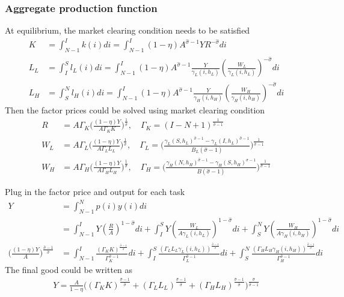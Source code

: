 \documentclass[12pt]{article}
\begin{document}
\begin{appendices}
\subsubsection*{Aggregate production function}
At equilibrium, the market clearing condition needs to be satisfied
\begin{align*}
K &= \int_{N-1}^I k(i)di=  \int_{N-1}^I(1-\eta)A^{\hat{\sigma}-1}YR^{-\hat{\sigma}}di \\
L_L &= \int_{I}^S l_L(i)di=  \int_{N-1}^I (1-\eta)A^{\hat{\sigma}-1}\frac{Y}{\gamma_L(i,h_L)}(\frac{W_L}{\gamma_L(i,h_L)})^{-\hat{\sigma}}di \\
L_H &=\int_{S}^N l_H(i)di=  \int_{N-1}^I (1-\eta)A^{\hat{\sigma}-1}\frac{Y}{\gamma_H(i,h_H)}(\frac{W_H}{\gamma_H(i,h_H)})^{-\hat{\sigma}} di
\end{align*}
Then the factor prices could be solved using market clearing condition 
\begin{align*}
R &=A\Gamma_K \Big(\frac{(1-\eta)Y}{A\Gamma_K K}\Big)^{\frac{1}{\hat{\sigma}}}, \quad \Gamma_K= (I-N+1)^{\frac{1}{\hat{\sigma}-1}}  \\
W_L &= A\Gamma_L\Big(\frac{(1-\eta)Y}{A\Gamma_LL_L}\Big)^{\frac{1}{\hat{\sigma}}}, \quad \Gamma_L=\Big(\frac{\gamma_L(S,h_L)^{\hat{\sigma}-1}-\gamma_L(I,h_L)^{\hat{\sigma}-1}}{B_L(\hat{\sigma}-1)}\Big)^{\frac{1}{\hat{\sigma}-1}}  \\
W_H &=A\Gamma_H\Big(\frac{(1-\eta)Y}{A\Gamma_HL_H}\Big)^{\frac{1}{\hat{\sigma}}}, \quad \Gamma_H = \Big(\frac{\gamma_H(N,h_H)^{\hat{\sigma}-1}-\gamma_H(S,h_H)^{\hat{\sigma}-1}}{B(\hat{\sigma}-1)}\Big)^{\frac{1}{\hat{\sigma}-1}} 
\end{align*}

Plug in the factor price and output for each task 
\begin{align*}
Y &= \int_{N-1}^N p(i)y(i) di \\
	&= \int_{N-1}^I Y(\frac{R}{A})^{1-\hat{\sigma}} di + \int_I^S Y(\frac{W_L}{A\gamma_L(i,h_L)})^{1-\hat{\sigma}} di  + \int_S^N Y(\frac{W_H}{A\gamma_H(i,h_H)})^{1-\hat{\sigma}} di \\
\Big(\frac{(1-\eta)Y}{A} \Big)^{\frac{\hat{\sigma}-1}{\hat{\sigma}}} &= \int_{N-1}^I \frac{(\Gamma_K K)^{\frac{\hat{\sigma}-1}{\hat{\sigma}}}}{\Gamma_K^{\hat{\sigma}-1}} di + \int_I^S \frac{(\Gamma_LL_L \gamma_L(i,h_L))^{\frac{\hat{\sigma}-1}{\hat{\sigma}}}}{\Gamma_L^{\hat{\sigma}-1}} di  + \int_S^N \frac{(\Gamma_HL_H \gamma_H(i,h_H))^{\frac{\hat{\sigma}-1}{\hat{\sigma}}}}{\Gamma_H^{\hat{\sigma}-1}} di 
 \end{align*}
The final good could be written as 
\begin{align*}
Y = \frac{A}{1-\eta}\Big((\Gamma_K K)^{\frac{\hat{\sigma}-1}{\hat{\sigma}}}+(\Gamma_LL_L)^{\frac{\hat{\sigma}-1}{\hat{\sigma}}}+(\Gamma_HL_H)^{\frac{\hat{\sigma}-1}{\hat{\sigma}}}\Big)^{\frac{\hat{\sigma}}{\hat{\sigma}-1}}
 \end{align*}
 

\end{appendices}
\end{document}
